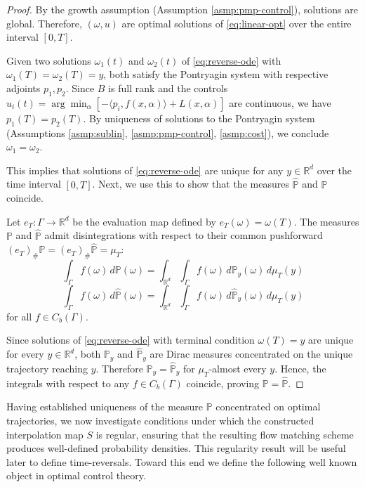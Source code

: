 \documentclass{article}
\begin{document}
\begin{proof}
By the growth assumption (Assumption \ref{asmp:pmp-control}), solutions are global. Therefore, $(\omega,u)$ are optimal solutions of \eqref{eq:linear-opt} over the entire interval $[0,T]$.

Given two solutions $\omega_1(t)$ and $\omega_2(t)$ of \eqref{eq:reverse-ode} with $\omega_1(T) = \omega_2(T) = y$, both satisfy the Pontryagin system with respective adjoints $p_1, p_2$. Since $B$ is full rank and the controls $u_i(t) = \arg\min_{\alpha} [-\langle p_i, f(x,\alpha) \rangle + L(x,\alpha)]$ are continuous, we have $p_1(T) = p_2(T)$. By uniqueness of solutions to the Pontryagin system (Assumptions \ref{asmp:sublin}, \ref{asmp:pmp-control}, \ref{asmp:cost}), we conclude $\omega_1 = \omega_2$.

This implies that solutions of \eqref{eq:reverse-ode} are unique for any $y \in \mathbb{R}^d$ over the time interval $[0,T]$. Next, we use this to show that the measures $\hat{\mathbb{P}}$ and $\mathbb{P}$ coincide. 

Let $e_T: \Gamma \rightarrow \mathbb{R}^d$ be the evaluation map defined by $e_T(\omega) = \omega(T)$. The measures $\mathbb{P}$ and $\hat{\mathbb{P}}$ admit disintegrations with respect to their common pushforward $(e_T)_{\#}\mathbb{P} = (e_T)_{\#}\hat{\mathbb{P}} = \mu_T$:
\[\int_{\Gamma} f(\omega) \, d\mathbb{P}(\omega) = \int_{\mathbb{R}^d} \int_{\Gamma} f(\omega) \, d\mathbb{P}_y(\omega) \, d\mu_T(y)\]
\[\int_{\Gamma} f(\omega) \, d\hat{\mathbb{P}}(\omega) = \int_{\mathbb{R}^d} \int_{\Gamma} f(\omega) \, d\hat{\mathbb{P}}_y(\omega) \, d\mu_T(y)\]
for all $f \in C_b(\Gamma)$. 

Since solutions of \eqref{eq:reverse-ode} with terminal condition $\omega(T) = y$ are unique for every $y \in \mathbb{R}^d$, both $\mathbb{P}_y$ and $\hat{\mathbb{P}}_y$ are Dirac measures concentrated on the unique trajectory reaching $y$. Therefore $\mathbb{P}_y = \hat{\mathbb{P}}_y$ for $\mu_T$-almost every $y$. Hence, the integrals with respect to any $f \in C_b(\Gamma)$ coincide, proving $\mathbb{P} = \hat{\mathbb{P}}$.
\end{proof}

Having established uniqueness of the measure $\mathbb{P}$ concentrated on optimal trajectories, we now investigate conditions under which the constructed interpolation map $S$ is regular, ensuring that the resulting flow matching scheme produces well-defined probability densities. This regularity result will be useful later to define time-reversals. Toward this end we define the following well known object in optimal control theory.
\end{document}
